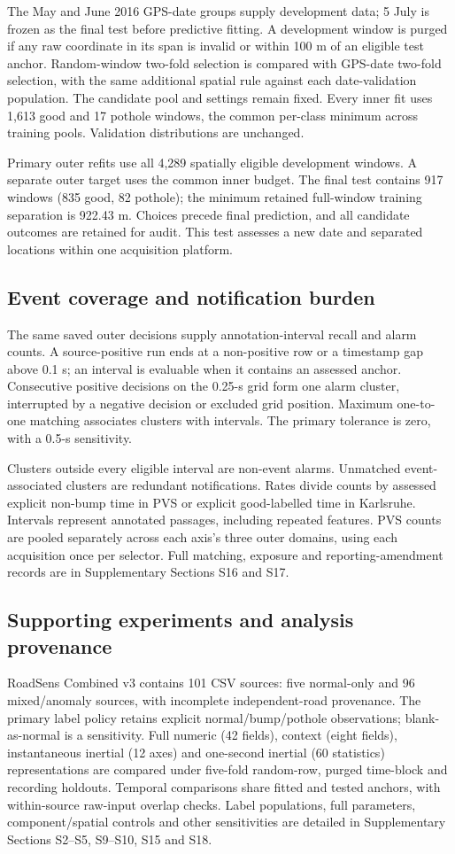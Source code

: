 The May and June 2016 GPS-date groups supply development data; 5 July is frozen as the final test before predictive fitting. A development window is purged if any raw coordinate in its span is invalid or within 100 m of an eligible test anchor. Random-window two-fold selection is compared with GPS-date two-fold selection, with the same additional spatial rule against each date-validation population. The candidate pool and settings remain fixed. Every inner fit uses 1,613 good and 17 pothole windows, the common per-class minimum across training pools. Validation distributions are unchanged.

Primary outer refits use all 4,289 spatially eligible development windows. A separate outer target uses the common inner budget. The final test contains 917 windows (835 good, 82 pothole); the minimum retained full-window training separation is 922.43 m. Choices precede final prediction, and all candidate outcomes are retained for audit. This test assesses a new date and separated locations within one acquisition platform.

\subsection{Event coverage and notification burden}
The same saved outer decisions supply annotation-interval recall and alarm counts. A source-positive run ends at a non-positive row or a timestamp gap above 0.1 s; an interval is evaluable when it contains an assessed anchor. Consecutive positive decisions on the 0.25-s grid form one alarm cluster, interrupted by a negative decision or excluded grid position. Maximum one-to-one matching associates clusters with intervals. The primary tolerance is zero, with a 0.5-s sensitivity.

Clusters outside every eligible interval are non-event alarms. Unmatched event-associated clusters are redundant notifications. Rates divide counts by assessed explicit non-bump time in PVS or explicit good-labelled time in Karlsruhe. Intervals represent annotated passages, including repeated features. PVS counts are pooled separately across each axis's three outer domains, using each acquisition once per selector. Full matching, exposure and reporting-amendment records are in Supplementary Sections S16 and S17.

\subsection{Supporting experiments and analysis provenance}
RoadSens Combined v3 contains 101 CSV sources: five normal-only and 96 mixed/anomaly sources, with incomplete independent-road provenance. The primary label policy retains explicit normal/bump/pothole observations; blank-as-normal is a sensitivity. Full numeric (42 fields), context (eight fields), instantaneous inertial (12 axes) and one-second inertial (60 statistics) representations are compared under five-fold random-row, purged time-block and recording holdouts. Temporal comparisons share fitted and tested anchors, with within-source raw-input overlap checks. Label populations, full parameters, component/spatial controls and other sensitivities are detailed in Supplementary Sections S2--S5, S9--S10, S15 and S18.

